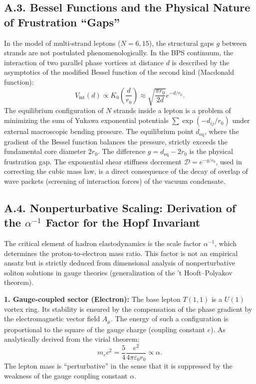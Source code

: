 \documentclass[11pt,a4paper]{article}
\begin{document}
\subsection*{A.3. Bessel Functions and the Physical Nature of Frustration ``Gaps''}
In the model of multi-strand leptons ($N=6,15$), the structural gaps $g$ between strands are not postulated phenomenologically. In the BPS continuum, the interaction of two parallel phase vortices at distance $d$ is described by the asymptotics of the modified Bessel function of the second kind (Macdonald function):
\begin{equation}
V_{\text{int}}(d) \propto K_0\left(\frac{d}{r_0}\right) \approx \sqrt{\frac{\pi r_0}{2d}} e^{-d/r_0}.
\end{equation}
The equilibrium configuration of $N$ strands inside a lepton is a problem of minimizing the sum of Yukawa exponential potentials $\sum \exp(-d_{ij}/r_0)$ under external macroscopic bending pressure. The equilibrium point $d_{\text{eq}}$, where the gradient of the Bessel function balances the pressure, strictly exceeds the fundamental core diameter $2r_0$.
The difference $g = d_{\text{eq}} - 2r_0$ is the physical frustration gap. The exponential shear stiffness decrement $\mathcal{D} = e^{-g/r_0}$, used in correcting the cubic mass law, is a direct consequence of the decay of overlap of wave packets (screening of interaction forces) of the vacuum condensate.

\subsection*{A.4. Nonperturbative Scaling: Derivation of the $\alpha^{-1}$ Factor for the Hopf Invariant}

The critical element of hadron elastodynamics is the scale factor $\alpha^{-1}$, which determines the proton-to-electron mass ratio. This factor is not an empirical ansatz but is strictly deduced from dimensional analysis of nonperturbative soliton solutions in gauge theories (generalization of the 't Hooft–Polyakov theorem).

\textbf{1. Gauge-coupled sector (Electron):}
The base lepton $T(1,1)$ is a $U(1)$ vortex ring. Its stability is ensured by the compensation of the phase gradient by the electromagnetic vector field $A_\mu$. The energy of such a configuration is proportional to the square of the gauge charge (coupling constant $e$). As analytically derived from the virial theorem:
\begin{equation}
m_e c^2 = \frac{5}{4} \frac{e^2}{4\pi\varepsilon_0 r_0} \propto \alpha.
\label{eq:me_scaling}
\end{equation}
The lepton mass is ``perturbative'' in the sense that it is suppressed by the weakness of the gauge coupling constant $\alpha$.
\end{document}
